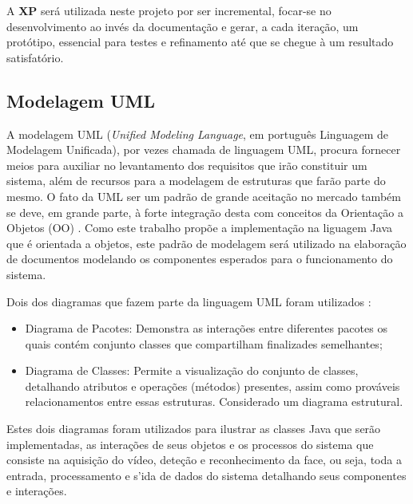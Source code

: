 A \textbf{XP} será utilizada neste projeto por ser incremental, focar-se no desenvolvimento ao invés da documentação e gerar, a cada iteração, um protótipo, essencial para testes e refinamento até que se chegue à um resultado satisfatório.



\subsection{Modelagem UML}\label{subsec:uml}

A modelagem UML (\textit{Unified Modeling Language}, em português Linguagem de Modelagem Unificada), por vezes chamada de linguagem UML, procura fornecer meios para auxiliar no levantamento dos requisitos que irão constituir um sistema, além de recursos para a modelagem de estruturas que farão parte do mesmo. O fato da UML ser um padrão de grande aceitação no mercado também se deve, em grande parte, à forte integração desta com conceitos da Orientação a Objetos (OO) \cite{uml}. Como este trabalho propõe a implementação na liguagem Java que é orientada a objetos, este padrão de modelagem será utilizado na elaboração de documentos modelando os componentes esperados para o funcionamento do sistema.

Dois dos diagramas que fazem parte da linguagem UML foram utilizados \cite{uml}:


\begin{itemize}
	\item Diagrama de Pacotes: Demonstra as interações entre diferentes pacotes os quais contém conjunto classes que compartilham finalizades semelhantes;
	
	\item Diagrama de Classes: Permite a visualização do conjunto de classes, detalhando atributos e operações (métodos) presentes, assim como prováveis relacionamentos entre essas estruturas. Considerado um diagrama estrutural.

\end{itemize}

Estes dois diagramas foram utilizados para ilustrar as classes Java que serão implementadas, as interações de seus objetos e os processos do sistema que consiste na aquisição do vídeo, deteção e reconhecimento da face, ou seja, toda a entrada, processamento e s'ida de dados do sistema detalhando seus componentes e interações.

